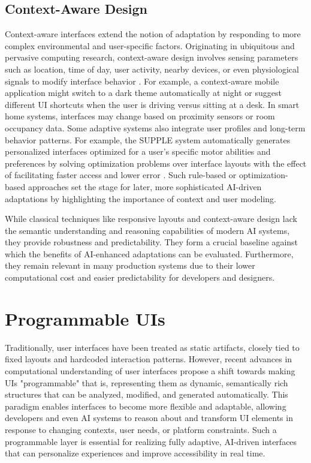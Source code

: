 \documentclass[openany]{book}
\begin{document}
\subsection{Context-Aware Design}
Context-aware interfaces extend the notion of adaptation by responding to more complex environmental and user-specific factors. Originating in ubiquitous and pervasive computing research, context-aware design involves sensing parameters such as location, time of day, user activity, nearby devices, or even physiological signals to modify interface behavior \cite{Schilit1994ContextAware, Dey2001Context}. For example, a context-aware mobile application might switch to a dark theme automatically at night or suggest different UI shortcuts when the user is driving versus sitting at a desk. In smart home systems, interfaces may change based on proximity sensors or room occupancy data.  
Some adaptive systems also integrate user profiles and long-term behavior patterns. For example, the SUPPLE system automatically generates personalized interfaces optimized for a user's specific motor abilities and preferences by solving optimization problems over interface layouts with the effect of facilitating faster access and lower error \cite{Gajos2008SUPPLE}. Such rule-based or optimization-based approaches set the stage for later, more sophisticated AI-driven adaptations by highlighting the importance of context and user modeling.

While classical techniques like responsive layouts and context-aware design lack the semantic understanding and reasoning capabilities of modern AI systems, they provide robustness and predictability. They form a crucial baseline against which the benefits of AI-enhanced adaptations can be evaluated. Furthermore, they remain relevant in many production systems due to their lower computational cost and easier predictability for developers and designers.

\section{Programmable UIs}
Traditionally, user interfaces have been treated as static artifacts, closely tied to fixed layouts and hardcoded interaction patterns. However, recent advances in computational understanding of user interfaces propose a shift towards making UIs "programmable" that is, representing them as dynamic, semantically rich structures that can be analyzed, modified, and generated automatically. This paradigm enables interfaces to become more flexible and adaptable, allowing developers and even AI systems to reason about and transform UI elements in response to changing contexts, user needs, or platform constraints. Such a programmable layer is essential for realizing fully adaptive, AI-driven interfaces that can personalize experiences and improve accessibility in real time.
\end{document}

